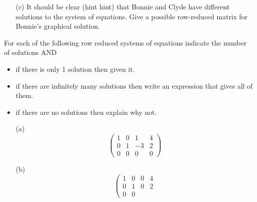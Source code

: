 \begin{problem}
\begin{enumerate}
    \item[(c)] It should be clear (hint hint) that Bonnie and Clyde have different
        solutions to the system of equations.  Give a possible row-reduced matrix for
        Bonnie's graphical solution. 
    \end{enumerate}
\end{problem}

\begin{problem}
    For each of the following row reduced systems of equations indicate the number of
    solutions AND
    \begin{itemize}
        \item if there is only 1 solution then given it.  
        \item if there are infinitely many solutions then write an expression that gives
            all of them.
        \item if there are no solutions then explain why not.
    \end{itemize}
    \begin{enumerate}
        \item[(a)] \[ \left( \begin{array}{ccc|c} 1 & 0 & 1 & 4 \\ 0 & 1 & -3 & 2 \\ 0 & 0
                & 0 & 0 \end{array} \right) \]
                \solution{
                    \[ \begin{pmatrix} x_1 \\ x_2 \\ x_3 \end{pmatrix} = \begin{pmatrix} 4
                            \\ 2 \\ 0 \end{pmatrix} + \begin{pmatrix} -1 \\ 3 \\ 1
                            \end{pmatrix} t \quad \text{for} \quad t\in\mathbb{R} \]
                        }
            \item[(b)]  \[ \left( \begin{array}{ccc|c} 1 & 0 & 0 & 4 \\ 0 & 1 & 0 & 2 \\ 0 & 0

\end{array}\]
\end{enumerate}
\end{problem}
